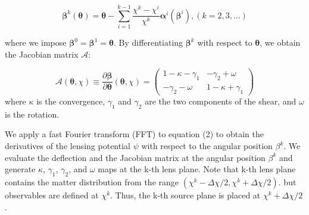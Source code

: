 \documentclass[fleqn,usenatbib]{mnras}
\begin{document}
\begin{equation}
    \boldsymbol{\beta}^k(\boldsymbol{\theta})=\boldsymbol{\theta}-\sum_{i=1}^{k-1} \frac{\chi^k-\chi^i}{\chi^k} \boldsymbol{\alpha}^i\left(\boldsymbol{\beta}^i\right),(k=2,3, \ldots)
\end{equation}

where we impose $\boldsymbol{\beta}^0=\boldsymbol{\beta}^1=\boldsymbol{\theta}$.
By differentiating $\boldsymbol{\beta}^k$ with respect to $\boldsymbol{\theta}$, 
we obtain the Jacobian matrix $\mathcal{A}$:

\begin{equation}
    \mathcal{A}(\boldsymbol{\theta}, \chi)\equiv \frac{\partial \boldsymbol{\beta}}{\partial \boldsymbol{\theta}}(\boldsymbol{\theta}, \chi)=
    \left(\begin{array}{cc}
        1 - \kappa - \gamma_1 & -\gamma_2 + \omega \\
        -\gamma_2 - \omega & 1 - \kappa + \gamma_1
    \end{array}\right)
\end{equation}
where $\kappa$ is the convergence, $\gamma_1$ and $\gamma_2$ are the two components of the shear, 
and $\omega$ is the rotation.

We apply a fast Fourier transform (FFT) to equation (2) to obtain the derivatives of the lensing potential $\psi$ with respect to the angular position $\beta^k$.
We evaluate the deflection and the Jacobian matrix at the angular position $\beta^k$ and generate $\kappa$, $\gamma_1$, $\gamma_2$, and $\omega$ maps at the k-th lens plane.
Note that k-th lens plane contains the matter distribution from the range $\left( \chi^k - \Delta \chi/2, \chi^k + \Delta \chi/2 \right)$.
but observables are defined at $\chi^k$. Thus, the k-th source plane is placed at $\chi^k + \Delta \chi/2$.
\end{document}
